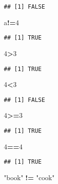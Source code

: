\documentclass[
]{article}
\newenvironment{Shaded}{\begin{snugshade}}{\end{snugshade}}
\newcommand{\DecValTok}[1]{\textcolor[rgb]{0.00,0.00,0.81}{#1}}
\newcommand{\NormalTok}[1]{#1}
\newcommand{\OperatorTok}[1]{\textcolor[rgb]{0.81,0.36,0.00}{\textbf{#1}}}
\newcommand{\StringTok}[1]{\textcolor[rgb]{0.31,0.60,0.02}{#1}}
\begin{document}
\begin{verbatim}
## [1] FALSE
\end{verbatim}

\begin{Shaded}
\begin{Highlighting}[]
\NormalTok{a}\OperatorTok{!=}\DecValTok{4}
\end{Highlighting}
\end{Shaded}

\begin{verbatim}
## [1] TRUE
\end{verbatim}

\begin{Shaded}
\begin{Highlighting}[]
\DecValTok{4}\OperatorTok{>}\DecValTok{3}
\end{Highlighting}
\end{Shaded}

\begin{verbatim}
## [1] TRUE
\end{verbatim}

\begin{Shaded}
\begin{Highlighting}[]
\DecValTok{4}\OperatorTok{<}\DecValTok{3}
\end{Highlighting}
\end{Shaded}

\begin{verbatim}
## [1] FALSE
\end{verbatim}

\begin{Shaded}
\begin{Highlighting}[]
\DecValTok{4}\OperatorTok{>=}\DecValTok{3}
\end{Highlighting}
\end{Shaded}

\begin{verbatim}
## [1] TRUE
\end{verbatim}

\begin{Shaded}
\begin{Highlighting}[]
\DecValTok{4}\OperatorTok{==}\DecValTok{4}
\end{Highlighting}
\end{Shaded}

\begin{verbatim}
## [1] TRUE
\end{verbatim}

\begin{Shaded}
\begin{Highlighting}[]
\StringTok{"book"} \OperatorTok{!=}\StringTok{ "cook"}
\end{Highlighting}
\end{Shaded}
\end{document}
